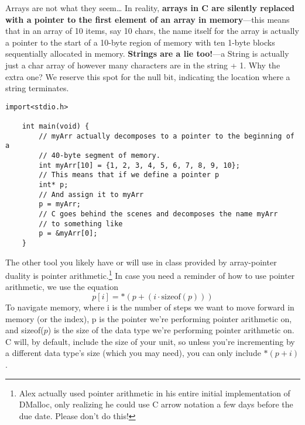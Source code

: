 \documentclass[a4paper, 12pt]{article}
\begin{document}
\begin{flushleft}
	Arrays are not what they seem\dots
	\newline\newline
	In reality, \textbf{arrays in C are silently replaced with a pointer to the first element of an array in memory}---this means that in an array of 10 items, say 10 chars, the name itself
	for the array is actually a pointer to the start of a 10-byte region of memory with ten 1-byte blocks sequentially allocated in memory.
	\newline\newline
	\textbf{Strings are a lie too!}---a String is actually just a char array of however many characters are in the string + 1. Why the extra one?
	We reserve this spot for the null bit, indicating the location where a string terminates.

	\begin{lstlisting}[style=CStyle]
    import<stdio.h>

    int main(void) {
        // myArr actually decomposes to a pointer to the beginning of a
        // 40-byte segment of memory.
        int myArr[10] = {1, 2, 3, 4, 5, 6, 7, 8, 9, 10};
        // This means that if we define a pointer p
        int* p;
        // And assign it to myArr
        p = myArr;
        // C goes behind the scenes and decomposes the name myArr
        // to something like
        p = &myArr[0];
    }
    \end{lstlisting}

	\FloatBarrier
	The other tool you likely have or will use in class provided by array-pointer duality is pointer arithmetic.\footnote{Alex actually used pointer arithmetic in his entire initial implementation of DMalloc, only realizing he could use C
		arrow notation a few days before the due date. Please don't do this!}
	In case you need a reminder of how to use pointer arithmetic, we use the equation $$p[i] = *(p + (i \cdot \text{sizeof}(p)))$$ To navigate memory, where i is the number of steps we want
	to move forward in memory (or the index), p is the pointer we're performing pointer arithmetic on, and sizeof($p$) is the size of the data type we're performing pointer arithmetic on. C will, by default,
	include the size of your unit, so unless you're incrementing by a different data type's size (which you may need), you can only include $*(p + i)$.


\end{flushleft}
\end{document}
